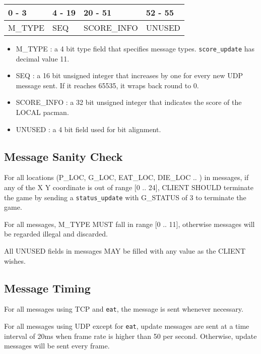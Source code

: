 \documentclass[]{article}
\begin{document}
\begin{longtable}[]{@{}llll@{}}
\toprule
0 - 3 & 4 - 19 & 20 - 51 & 52 - 55\tabularnewline
\midrule
\endhead
M\_TYPE & SEQ & SCORE\_INFO & UNUSED\tabularnewline
\bottomrule
\end{longtable}

\begin{itemize}
\item
  M\_TYPE : a 4 bit type field that specifies message types.
  \texttt{score\_update} has decimal value 11.
\item
  SEQ : a 16 bit unsigned integer that increases by one for every new
  UDP message sent. If it reaches 65535, it wraps back round to 0.
\item
  SCORE\_INFO : a 32 bit unsigned integer that indicates the score of
  the LOCAL pacman.
\item
  UNUSED : a 4 bit field used for bit alignment.
\end{itemize}

\hypertarget{message-sanity-check}{%
\subsection{Message Sanity Check}\label{message-sanity-check}}

For all locations (P\_LOC, G\_LOC, EAT\_LOC, DIE\_LOC .. ) in messages,
if any of the X Y coordinate is out of range {[}0 .. 24{]}, CLIENT
SHOULD terminate the game by sending a \texttt{status\_update} with
G\_STATUS of 3 to terminate the game.

For all messages, M\_TYPE MUST fall in range {[}0 .. 11{]}, otherwise
messages will be regarded illegal and discarded.

All UNUSED fields in messages MAY be filled with any value as the CLIENT
wishes.

\hypertarget{message-timing}{%
\subsection{Message Timing}\label{message-timing}}

For all messages using TCP and \texttt{eat}, the message is sent
whenever necessary.

For all messages using UDP except for \texttt{eat}, update messages are
sent at a time interval of 20ms when frame rate is higher than 50 per
second. Otherwise, update messages will be sent every frame.
\end{document}
